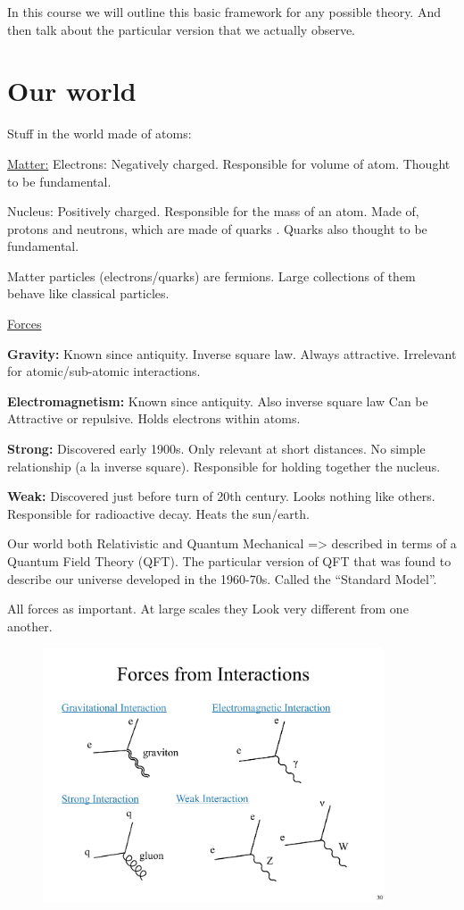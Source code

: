 In this course we will outline this basic framework for any possible theory.
And then talk about the particular version that we actually observe.


\section{Our world}

Stuff in the world made of atoms:

\underline{Matter:}
Electrons: Negatively charged. 
Responsible for volume of atom.
Thought to be fundamental.

Nucleus: Positively charged.
Responsible for the mass of an atom.
Made of, protons and neutrons, which are made of quarks .
Quarks also thought to be fundamental.

Matter particles (electrons/quarks) are fermions.
Large collections of them behave like classical particles.

\underline{Forces}

\textbf{Gravity:}
Known since antiquity. 
Inverse square law.
Always attractive. 
Irrelevant for atomic/sub-atomic interactions.

\textbf{Electromagnetism:}
Known since antiquity.
Also inverse square law
Can be Attractive or repulsive.
Holds electrons within atoms.

\textbf{Strong:}
Discovered early 1900s.
Only relevant at short distances.
No simple relationship (a la inverse square).
Responsible for holding together the nucleus.

\textbf{Weak:}
Discovered just before turn of 20th century.
Looks nothing like others.
Responsible for radioactive decay. 
Heats the sun/earth.

Our world both Relativistic and Quantum Mechanical => described in terms of a Quantum Field Theory (QFT).
The particular version of QFT that was found to describe our universe developed in the 1960-70s.
Called the ``Standard Model''.

All forces as important.
At large scales they Look very different from one another.

\begin{figure}[h]
\centering
\includegraphics[width=0.9\textwidth]{./Forces.pdf}
\end{figure}

